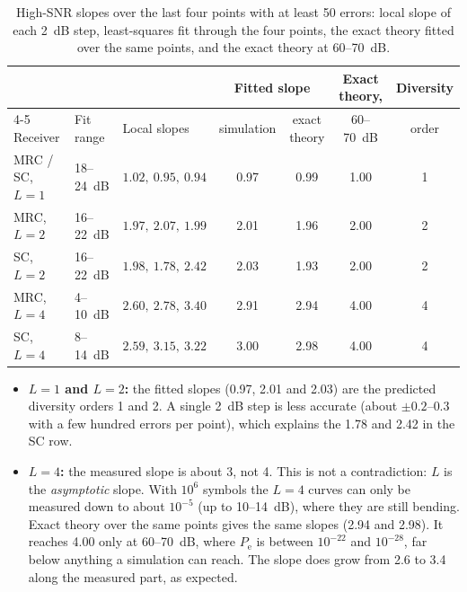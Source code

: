 \documentclass[11pt,a4paper]{article}
\newcommand{\Pe}{P_{\mathrm{e}}}
\begin{document}
\begin{table}[htbp]
  \centering\small
  \caption{High-SNR slopes over the last four points with at least 50 errors:
           local slope of each 2~dB step, least-squares fit through the four
           points, the exact theory fitted over the same points, and the exact theory
           at 60--70~dB.}
  \label{tab:p2-slopes}
  \begin{tabular}{@{}lllcccc@{}}
    \toprule
    & & & \multicolumn{2}{c}{Fitted slope} & Exact theory, & Diversity \\
    \cmidrule(lr){4-5}
    Receiver & Fit range & Local slopes & simulation & exact theory & 60--70~dB & order \\
    \midrule
    MRC / SC, $L = 1$ & 18--24~dB & $1.02,\ 0.95,\ 0.94$ & 0.97 & 0.99 & 1.00 & 1 \\
    MRC, $L = 2$      & 16--22~dB & $1.97,\ 2.07,\ 1.99$ & 2.01 & 1.96 & 2.00 & 2 \\
    SC, $L = 2$       & 16--22~dB & $1.98,\ 1.78,\ 2.42$ & 2.03 & 1.93 & 2.00 & 2 \\
    MRC, $L = 4$      & 4--10~dB  & $2.60,\ 2.78,\ 3.40$ & 2.91 & 2.94 & 4.00 & 4 \\
    SC, $L = 4$       & 8--14~dB  & $2.59,\ 3.15,\ 3.22$ & 3.00 & 2.98 & 4.00 & 4 \\
    \bottomrule
  \end{tabular}
\end{table}

\begin{itemize}
  \item \textbf{$L = 1$ and $L = 2$:} the fitted slopes (0.97, 2.01 and 2.03) are the
        predicted diversity orders 1 and 2. A single 2~dB step is less accurate
        (about $\pm0.2$--$0.3$ with a few hundred errors per point), which explains
        the 1.78 and 2.42 in the SC row.
  \item \textbf{$L = 4$:} the measured slope is about 3, not 4. This is not a
        contradiction: $L$ is the \emph{asymptotic} slope. With $10^6$ symbols the
        $L = 4$ curves can only be measured down to about $10^{-5}$ (up to
        10--14~dB), where they are still bending. Exact theory over the same points
        gives the same slopes (2.94 and 2.98). It reaches 4.00 only at 60--70~dB,
        where $\Pe$ is between $10^{-22}$ and $10^{-28}$, far below anything a
        simulation can reach. The
        slope does grow from 2.6 to 3.4 along the measured part, as expected.
\end{itemize}
\end{document}
